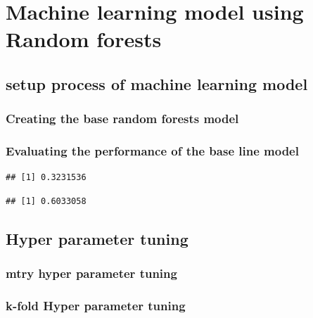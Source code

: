 \documentclass[11pt,preprint, authoryear]{elsarticle}
\numberwithin{equation}{section}
\numberwithin{figure}{section}
\numberwithin{table}{section}
\begin{document}
\hypertarget{machine-learning-model-using-random-forests}{%
\section{Machine learning model using Random
forests}\label{machine-learning-model-using-random-forests}}

\hypertarget{setup-process-of-machine-learning-model}{%
\subsection{setup process of machine learning
model}\label{setup-process-of-machine-learning-model}}

\hypertarget{creating-the-base-random-forests-model}{%
\subsubsection{Creating the base random forests
model}\label{creating-the-base-random-forests-model}}

\hypertarget{evaluating-the-performance-of-the-base-line-model}{%
\subsubsection{Evaluating the performance of the base line
model}\label{evaluating-the-performance-of-the-base-line-model}}

\begin{verbatim}
## [1] 0.3231536
\end{verbatim}

\begin{verbatim}
## [1] 0.6033058
\end{verbatim}

\hypertarget{hyper-parameter-tuning}{%
\subsection{Hyper parameter tuning}\label{hyper-parameter-tuning}}

\hypertarget{mtry-hyper-parameter-tuning}{%
\subsubsection{mtry hyper parameter
tuning}\label{mtry-hyper-parameter-tuning}}

\hypertarget{k-fold-hyper-parameter-tuning}{%
\subsubsection{k-fold Hyper parameter
tuning}\label{k-fold-hyper-parameter-tuning}}
\end{document}
